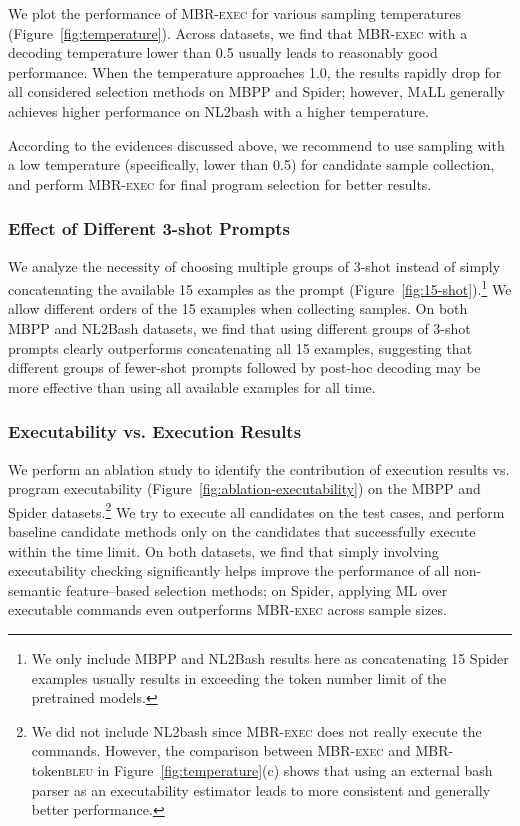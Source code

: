 \documentclass[11pt]{article}
\newcommand{\mbrexec}{\textsc{MBR-exec}\xspace}
\newcommand{\maxlikelihood}{ML\xspace}
\newcommand{\maxavglikelihood}{\textsc{MaLL}\xspace}
\begin{document}
We plot the performance of \mbrexec for various sampling temperatures (Figure~\ref{fig:temperature}). Across datasets, we find that \mbrexec with a decoding temperature lower than 0.5 usually leads to reasonably good performance. When the temperature approaches 1.0, the results rapidly drop for all considered selection methods on MBPP and Spider; however, \maxavglikelihood generally achieves higher performance on NL2bash with a higher temperature. 

According to the evidences discussed above, we recommend to use sampling with a low temperature (specifically, lower than 0.5) for candidate sample collection, and perform \mbrexec for final program selection for better results. 

\subsubsection{Effect of Different 3-shot Prompts}
\label{sec:expr-15shot}
We analyze the necessity of choosing multiple groups of 3-shot instead of simply concatenating the available 15 examples as the prompt (Figure~\ref{fig:15-shot}).\footnote{We only include MBPP and NL2Bash results here as concatenating 15 Spider examples usually results in exceeding the token number limit of the pretrained models.} 
We allow different orders of the 15 examples when collecting samples. 
On both MBPP and NL2Bash datasets, we find that using different groups of 3-shot prompts clearly outperforms concatenating all 15 examples, suggesting that different groups of fewer-shot prompts followed by post-hoc decoding may be more effective than using all available examples for all time.

\subsubsection{Executability vs. Execution Results}
\label{sec:expr-executability}
We perform an ablation study to identify the contribution of execution results vs. program executability (Figure~\ref{fig:ablation-executability}) on the MBPP and Spider datasets.\footnote{We did not include NL2bash since \mbrexec does not really execute the commands. However, the comparison between \mbrexec and MBR-token\textsc{bleu} in Figure~\ref{fig:temperature}(c) shows that using an external bash parser as an executability estimator leads to more consistent and generally better performance.} We try to execute all candidates on the test cases, and perform baseline candidate methods only on the candidates that successfully execute within the time limit. On both datasets, we find that simply involving executability checking significantly helps improve the performance of all non-semantic feature--based selection methods; on Spider, applying \maxlikelihood over executable commands even outperforms \mbrexec across sample sizes. 
\end{document}
